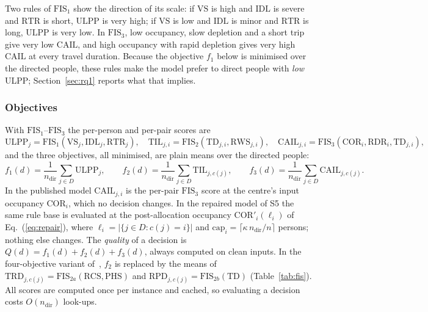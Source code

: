\documentclass[systems,article,submit,moreauthors,pdftex]{Definitions/mdpi}
\begin{document}
Two rules of $\mathrm{FIS}_1$ show the direction of its scale: if $\mathrm{VS}$ is high and
$\mathrm{IDL}$ is severe and $\mathrm{RTR}$ is short, $\mathrm{ULPP}$ is very high; if
$\mathrm{VS}$ is low and $\mathrm{IDL}$ is minor and $\mathrm{RTR}$ is long, $\mathrm{ULPP}$ is
very low. In $\mathrm{FIS}_3$, low occupancy, slow depletion and a short trip give very low
$\mathrm{CAIL}$, and high occupancy with rapid depletion gives very high $\mathrm{CAIL}$ at
every travel duration.
Because the objective $f_1$ below is minimised over the directed people, these rules make the
model prefer to direct people with \emph{low} ULPP; Section~\ref{sec:rq1} reports what that
implies.

\subsubsection{Objectives}
With $\mathrm{FIS}_1$--$\mathrm{FIS}_3$ the per-person and per-pair scores are
\begin{equation}\label{eq:scores}
\mathrm{ULPP}_j=\mathrm{FIS}_1(\mathrm{VS}_j,\mathrm{IDL}_j,\mathrm{RTR}_j),\quad
\mathrm{TIL}_{j,i}=\mathrm{FIS}_2(\mathrm{TD}_{j,i},\mathrm{RWS}_{j,i}),\quad
\mathrm{CAIL}_{j,i}=\mathrm{FIS}_3(\mathrm{COR}_i,\mathrm{RDR}_i,\mathrm{TD}_{j,i}),
\end{equation}
and the three objectives, all minimised, are plain means over the directed people:
\begin{equation}\label{eq:objectives}
f_1(d)=\frac{1}{n_{\mathrm{dir}}}\sum_{j\in D}\mathrm{ULPP}_j,\qquad
f_2(d)=\frac{1}{n_{\mathrm{dir}}}\sum_{j\in D}\mathrm{TIL}_{j,c(j)},\qquad
f_3(d)=\frac{1}{n_{\mathrm{dir}}}\sum_{j\in D}\mathrm{CAIL}_{j,c(j)}.
\end{equation}
In the published model $\mathrm{CAIL}_{j,i}$ is the per-pair $\mathrm{FIS}_3$ score at the
centre's input occupancy $\mathrm{COR}_i$, which no decision changes. In the repaired model of
S5 the same rule base is evaluated at the post-allocation occupancy
$\mathrm{COR}'_i(\ell_i)$ of Eq.~(\ref{eq:repair}), where $\ell_i=|\{j\in D: c(j)=i\}|$ and
$\mathrm{cap}_i=\lceil\kappa\,n_{\mathrm{dir}}/n\rceil$ persons; nothing else changes. The
\emph{quality} of a decision is $Q(d)=f_1(d)+f_2(d)+f_3(d)$, always computed on clean inputs.
In the four-objective variant of~\cite{rabiei2026resilient}, $f_2$ is replaced by the means of
$\mathrm{TRD}_{j,c(j)}=\mathrm{FIS}_{2a}(\mathrm{RCS},\mathrm{PHS})$ and
$\mathrm{RPD}_{j,c(j)}=\mathrm{FIS}_{2b}(\mathrm{TD})$ (Table~\ref{tab:fis}). All scores are
computed once per instance and cached, so evaluating a decision costs $O(n_{\mathrm{dir}})$
look-ups.
\end{document}
